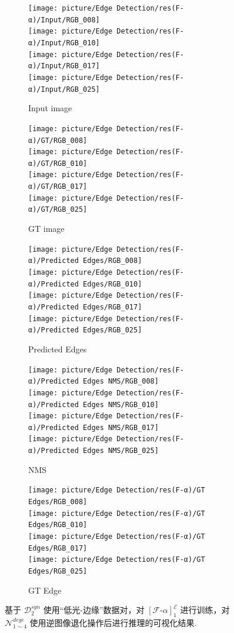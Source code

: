 \documentclass[a4paper]{ctexart}
\begin{document}
	\begin{figure}[htbp]
		\centering
		\begin{subfigure}{0.16\textwidth}
			\texttt{[image: picture/Edge Detection/res(F-α)/Input/RGB\_008]} \\
			\texttt{[image: picture/Edge Detection/res(F-α)/Input/RGB\_010]} \\
			\texttt{[image: picture/Edge Detection/res(F-α)/Input/RGB\_017]} \\
			\texttt{[image: picture/Edge Detection/res(F-α)/Input/RGB\_025]}
			\caption{Input image}
		\end{subfigure}
		\begin{subfigure}{0.16\textwidth}
			\texttt{[image: picture/Edge Detection/res(F-α)/GT/RGB\_008]} \\
			\texttt{[image: picture/Edge Detection/res(F-α)/GT/RGB\_010]} \\
			\texttt{[image: picture/Edge Detection/res(F-α)/GT/RGB\_017]} \\
			\texttt{[image: picture/Edge Detection/res(F-α)/GT/RGB\_025]}
			\caption{GT image}
		\end{subfigure}
		\begin{subfigure}{0.16\textwidth}
			\texttt{[image: picture/Edge Detection/res(F-α)/Predicted Edges/RGB\_008]} \\
			\texttt{[image: picture/Edge Detection/res(F-α)/Predicted Edges/RGB\_010]} \\
			\texttt{[image: picture/Edge Detection/res(F-α)/Predicted Edges/RGB\_017]} \\
			\texttt{[image: picture/Edge Detection/res(F-α)/Predicted Edges/RGB\_025]}
			\caption{Predicted Edges}
		\end{subfigure}
		\begin{subfigure}{0.16\textwidth}
			\texttt{[image: picture/Edge Detection/res(F-α)/Predicted Edges NMS/RGB\_008]} \\
			\texttt{[image: picture/Edge Detection/res(F-α)/Predicted Edges NMS/RGB\_010]} \\
			\texttt{[image: picture/Edge Detection/res(F-α)/Predicted Edges NMS/RGB\_017]} \\
			\texttt{[image: picture/Edge Detection/res(F-α)/Predicted Edges NMS/RGB\_025]}
			\caption{NMS}
		\end{subfigure}
		\begin{subfigure}{0.16\textwidth}
			\texttt{[image: picture/Edge Detection/res(F-α)/GT Edges/RGB\_008]} \\
			\texttt{[image: picture/Edge Detection/res(F-α)/GT Edges/RGB\_010]} \\
			\texttt{[image: picture/Edge Detection/res(F-α)/GT Edges/RGB\_017]} \\
			\texttt{[image: picture/Edge Detection/res(F-α)/GT Edges/RGB\_025]}
			\caption{GT Edge}
		\end{subfigure}
		\label{fig: LLtoEdge(straight)}
		\caption{基于 $\mathcal{D}^{syn}_{2}$ 使用“低光-边缘”数据对，对 ${\left[\mathcal{F}\text{-}\alpha\right]}^{\mathcal{E}}_1$ 进行训练，对 $\mathcal{N}_{1 \sim 4}^{dege}$ 使用逆图像退化操作后进行推理的可视化结果.}
	\end{figure}
	
\end{document}
